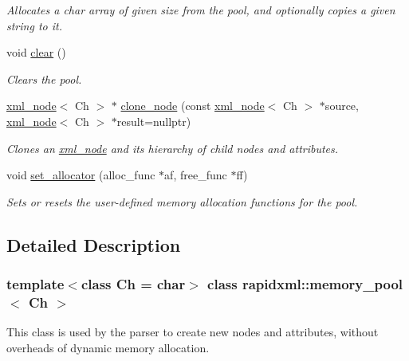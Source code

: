 \begin{DoxyCompactItemize}
\begin{DoxyCompactList}\small\item\em Allocates a char array of given size from the pool, and optionally copies a given string to it. \end{DoxyCompactList}\item 
void \mbox{\hyperlink{classrapidxml_1_1memory__pool_ac8bb3912a3ce86b15842e79d0b421204}{clear}} ()
\begin{DoxyCompactList}\small\item\em Clears the pool. \end{DoxyCompactList}\item 
\mbox{\hyperlink{classrapidxml_1_1xml__node}{xml\+\_\+node}}$<$ Ch $>$ $\ast$ \mbox{\hyperlink{classrapidxml_1_1memory__pool_ae8bc45920cb126b6a4bb29f667800ea2}{clone\+\_\+node}} (const \mbox{\hyperlink{classrapidxml_1_1xml__node}{xml\+\_\+node}}$<$ Ch $>$ $\ast$source, \mbox{\hyperlink{classrapidxml_1_1xml__node}{xml\+\_\+node}}$<$ Ch $>$ $\ast$result=nullptr)
\begin{DoxyCompactList}\small\item\em Clones an \mbox{\hyperlink{classrapidxml_1_1xml__node}{xml\+\_\+node}} and its hierarchy of child nodes and attributes. \end{DoxyCompactList}\item 
void \mbox{\hyperlink{classrapidxml_1_1memory__pool_ac0a55a6ef0837dca67572e357100d78a}{set\+\_\+allocator}} (alloc\+\_\+func $\ast$af, free\+\_\+func $\ast$ff)
\begin{DoxyCompactList}\small\item\em Sets or resets the user-\/defined memory allocation functions for the pool. \end{DoxyCompactList}\end{DoxyCompactItemize}


\subsection{Detailed Description}
\subsubsection*{template$<$class Ch = char$>$\newline
class rapidxml\+::memory\+\_\+pool$<$ Ch $>$}

This class is used by the parser to create new nodes and attributes, without overheads of dynamic memory allocation. 

